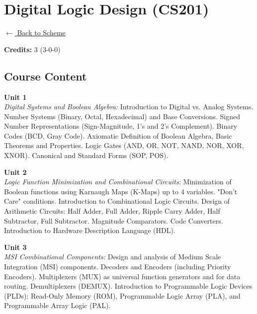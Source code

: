 \section*{Digital Logic Design (CS201)}
\label{course:CS201}

\noindent \small{\hyperref[main:scheme]{$\leftarrow$ Back to Scheme}} \vspace{0.5cm}

\noindent \textbf{Credits:} 3 (3-0-0)

\subsection*{Course Content}
\noindent\textbf{Unit 1} \\
\textit{Digital Systems and Boolean Algebra:} Introduction to Digital vs. Analog Systems. Number Systems (Binary, Octal, Hexadecimal) and Base Conversions. Signed Number Representations (Sign-Magnitude, 1's and 2's Complement). Binary Codes (BCD, Gray Code). Axiomatic Definition of Boolean Algebra, Basic Theorems and Properties. Logic Gates (AND, OR, NOT, NAND, NOR, XOR, XNOR). Canonical and Standard Forms (SOP, POS).

\vspace{0.3cm}

\noindent\textbf{Unit 2} \\
\textit{Logic Function Minimization and Combinational Circuits:} Minimization of Boolean functions using Karnaugh Maps (K-Maps) up to 4 variables. "Don't Care" conditions. Introduction to Combinational Logic Circuits. Design of Arithmetic Circuits: Half Adder, Full Adder, Ripple Carry Adder, Half Subtractor, Full Subtractor. Magnitude Comparators. Code Converters. Introduction to Hardware Description Language (HDL).

\vspace{0.3cm}

\noindent\textbf{Unit 3} \\
\textit{MSI Combinational Components:} Design and analysis of Medium Scale Integration (MSI) components. Decoders and Encoders (including Priority Encoders). Multiplexers (MUX) as universal function generators and for data routing. Demultiplexers (DEMUX). Introduction to Programmable Logic Devices (PLDs): Read-Only Memory (ROM), Programmable Logic Array (PLA), and Programmable Array Logic (PAL).

\vspace{0.3cm}

